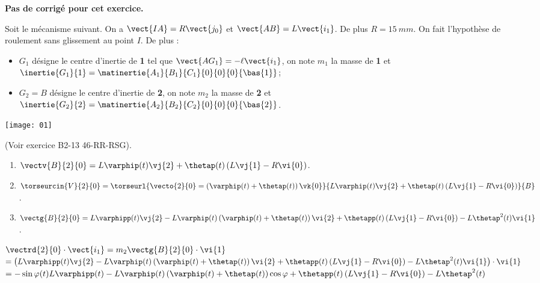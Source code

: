 \normalfalse \difficiletrue \tdifficilefalse
\correctionfalse


\setcounter{question}{0}
\ifcorrection
\else
\textbf{Pas de corrigé pour cet exercice.}
\fi

\ifprof
\else
Soit le mécanisme suivant. On a $\vect{IA}=R\vect{j_0}$ et $\vect{AB}=L\vect{i_1}$. De plus $R=\SI{15}{mm}$.
On fait l'hypothèse de roulement sans glissement au point $I$. De plus :
\begin{itemize}
\item $G_1$ désigne le centre d'inertie de \textbf{1} tel que $\vect{AG_1}=-\ell\vect{i_1}$, on note $m_1$ la masse de \textbf{1} et $\inertie{G_1}{1}=\matinertie{A_1}{B_1}{C_1}{0}{0}{0}{\bas{1}}$; 
\item $G_2=B$ désigne le centre d'inertie de \textbf{2}, on note $m_2$ la masse de \textbf{2} et $\inertie{G_2}{2}=\matinertie{A_2}{B_2}{C_2}{0}{0}{0}{\bas{2}}$.
\end{itemize}
\begin{center}
\texttt{[image: 01]}
\end{center}
\fi

\ifprof
(Voir exercice B2-13 46-RR-RSG).
\begin{enumerate}
\item $\vectv{B}{2}{0} = L\varphip(t)\vj{2} +\thetap(t)\left(L\vj{1}-R\vi{0}\right) $.
\item  $\torseurcin{V}{2}{0} = \torseurl{\vecto{2}{0}=\left( \varphip(t)+\thetap(t) \right) \vk{0} }{ L\varphip(t)\vj{2} +\thetap(t)\left(L\vj{1}-R\vi{0}\right)}{B}$.
\item $\vectg{B}{2}{0} =  L\varphipp(t)\vj{2}-L\varphip(t)\left(\varphip(t)+\thetap(t) \right)\vi{2}  + \thetapp(t)\left(L\vj{1}-R\vi{0}\right) - L\thetap^2(t)\vi{1}$.
\end{enumerate} 

$\vectrd{2}{0}\cdot \vect{i_1} = m_2 \vectg{B}{2}{0} \cdot \vi{1}$
$ =\left( L\varphipp(t)\vj{2}-L\varphip(t)\left(\varphip(t)+\thetap(t) \right)\vi{2}  + \thetapp(t)\left(L\vj{1}-R\vi{0}\right) - L\thetap^2(t)\vi{1} \right) \cdot \vi{1}$
$ = -\sin\varphi(t) L\varphipp(t)-L\varphip(t)\left(\varphip(t)+\thetap(t) \right)\cos\varphi  + \thetapp(t)\left(L\vj{1}-R\vi{0}\right) - L\thetap^2(t)$


